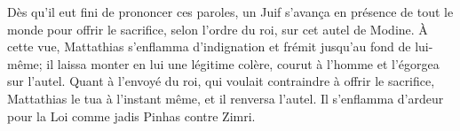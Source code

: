 Dès qu’il eut fini de prononcer ces paroles,
	un Juif s’avança en présence de tout le monde pour offrir le sacrifice,
		selon l’ordre du roi,
	sur cet autel de Modine.
À cette vue, Mattathias s’enflamma d’indignation et frémit jusqu’au fond de lui-même;
	il laissa monter en lui une légitime colère,
	courut à l’homme et l’égorgea sur l’autel.
Quant à l’envoyé du roi, qui voulait contraindre à offrir le sacrifice,
	Mattathias le tua à l’instant même, et il renversa l’autel.
Il s’enflamma d’ardeur pour la Loi comme jadis Pinhas contre Zimri.
